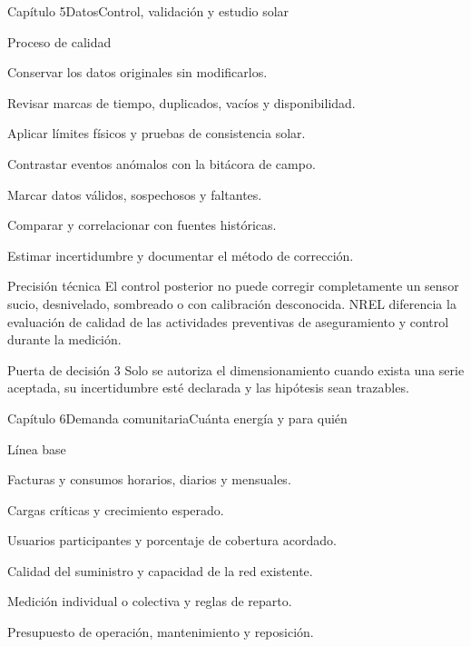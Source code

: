 \documentclass{../plantilla/hvtbook}
\begin{document}
\begin{HVTPage}{Capítulo 5}{Datos}{Control, validación y estudio solar}
\begin{HVTTaskOrdered}{Proceso de calidad}
  \item Conservar los datos originales sin modificarlos.
  \item Revisar marcas de tiempo, duplicados, vacíos y disponibilidad.
  \item Aplicar límites físicos y pruebas de consistencia solar.
  \item Contrastar eventos anómalos con la bitácora de campo.
  \item Marcar datos válidos, sospechosos y faltantes.
  \item Comparar y correlacionar con fuentes históricas.
  \item Estimar incertidumbre y documentar el método de corrección.
\end{HVTTaskOrdered}
\begin{HVTWarning}{Precisión técnica}
El control posterior no puede corregir completamente un sensor sucio, desnivelado, sombreado o con calibración desconocida. NREL diferencia la evaluación de calidad de las actividades preventivas de aseguramiento y control durante la medición. 
\end{HVTWarning}
\begin{HVTWarning}{Puerta de decisión 3}
Solo se autoriza el dimensionamiento cuando exista una serie aceptada, su incertidumbre esté declarada y las hipótesis sean trazables.
\end{HVTWarning}
\end{HVTPage}

\begin{HVTPage}{Capítulo 6}{Demanda comunitaria}{Cuánta energía y para quién}
\begin{HVTTask}{Línea base}
  \item Facturas y consumos horarios, diarios y mensuales.
  \item Cargas críticas y crecimiento esperado.
  \item Usuarios participantes y porcentaje de cobertura acordado.
  \item Calidad del suministro y capacidad de la red existente.
  \item Medición individual o colectiva y reglas de reparto.
  \item Presupuesto de operación, mantenimiento y reposición.
\end{HVTTask}
\end{HVTPage}
\end{document}

